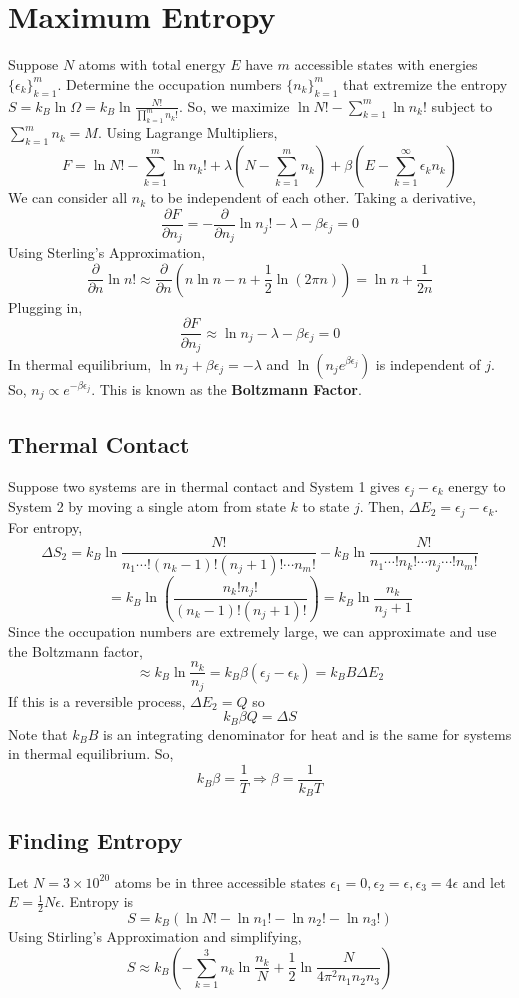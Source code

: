 \documentclass[../main.tex]{subfiles}
\begin{document}
\section{Maximum Entropy}
Suppose $N$ atoms with total energy $E$ have $m$ accessible states with energies $\{\epsilon_{k}\}_{k=1}^{m}$.
Determine the occupation numbers $\{n_{k}\}_{k=1}^{m}$ that extremize the entropy $S=k_{B}\ln\Omega=k_{B}\ln\frac{N!}{\prod_{k=1}^{m}n_{k}!}$.
So, we maximize $\ln N!-\sum_{k=1}^{m}\ln n_{k}!$ subject to $\sum_{k=1}^{m}n_{k}=M$.
Using Lagrange Multipliers,
$$
F=\ln N!-\sum_{k=1}^{m}\ln n_{k}!
+\lambda\left(N-\sum_{k=1}^{m}n_{k}\right)
+\beta\left(E-\sum_{k=1}^{\infty}\epsilon_{k}n_{k}\right)
$$
We can consider all $n_{k}$ to be independent of each other. Taking a derivative,
$$\frac{\partial F}{\partial n_{j}}=-\frac{\partial}{\partial n_{j}}\ln n_{j}!-\lambda-\beta\epsilon_{j}=0$$
Using Sterling's Approximation, 
$$\frac{\partial}{\partial n}\ln n!\approx
\frac{\partial}{\partial n}\left(n\ln n-n+\frac{1}{2}\ln(2\pi n)\right)
=\ln n+\frac{1}{2n}$$
Plugging in,
$$\frac{\partial F}{\partial n_{j}}\approx \ln n_{j}-\lambda-\beta\epsilon_{j}=0$$
In thermal equilibrium, $\ln n_{j}+\beta \epsilon_{j}=-\lambda$ and $\ln(n_{j}e^{\beta \epsilon_{j}})$
is independent of $j$. So, $n_{j}\propto e^{-\beta \epsilon_{j}}$. This is known as the \textbf{Boltzmann Factor}.

\subsection{Thermal Contact}
Suppose two systems are in thermal contact and System 1 gives $\epsilon_{j}-\epsilon_{k}$ energy to System 2 by moving
a single atom from state $k$ to state $j$. Then, $\Delta E_{2}=\epsilon_{j}-\epsilon_{k}$. For entropy,
$$\Delta S_{2}=k_{B}\ln\frac{N!}{n_{1}\cdots!(n_{k}-1)!(n_{j}+1)!\cdots n_{m}!}
-k_{B}\ln\frac{N!}{n_{1}\cdots!n_{k}!\cdots n_{j}\cdots!n_{m}!}$$
$$=k_{B}\ln\left(\frac{n_{k}!n_{j}!}{(n_{k}-1)!(n_{j}+1)!}\right)
=k_{B}\ln \frac{n_{k}}{n_{j}+1}$$
Since the occupation numbers are extremely large, we can approximate and use the Boltzmann factor,
$$\approx k_{B}\ln\frac{n_{k}}{n_{j}}=k_{B}\beta(\epsilon_{j}-\epsilon_{k})=k_{B}B\Delta E_{2}$$
If this is a reversible process, $\Delta E_{2}=Q$ so
$$\boxed{k_{B}\beta Q=\Delta S}$$
Note that $k_{B}B$ is an integrating denominator for heat and is the same for systems in thermal equilibrium.
So,
$$k_{B}\beta =\frac{1}{T}\Rightarrow \boxed{\beta=\frac{1}{k_{B}T}}$$

\subsection{Finding Entropy}
Let $N=3\times 10^{20}$ atoms be in three accessible states $\epsilon_{1}=0,\epsilon_{2}=\epsilon,\epsilon_{3}=4\epsilon$
and let $E=\frac{1}{2}N\epsilon$. Entropy is
$$S=k_{B}(\ln N!-\ln n_{1}!-\ln n_{2}!-\ln n_{3}!)$$
Using Stirling's Approximation and simplifying,
$$S\approx k_{B}\left(-\sum_{k=1}^{3}n_{k}\ln\frac{n_{k}}{N}
+\frac{1}{2}\ln\frac{N}{4\pi^{2}n_{1}n_{2}n_{3}}\right)$$
\end{document}
